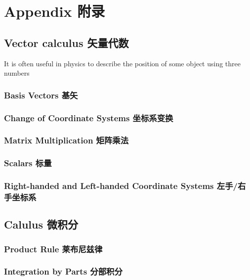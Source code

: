 
\appendix
\part{Appendix 附录}
\chapter[矢量代数]{Vector calculus 矢量代数}

It is often useful in physics to describe the position of some object
using three numbers

\section[基矢]{Basis Vectors 基矢}

\section[坐标系变换]{Change of Coordinate Systems 坐标系变换}

\section[矩阵乘法]{Matrix Multiplication 矩阵乘法}

\section[标量]{Scalars 标量}

\section[左手/右手坐标系]{Right-handed and Left-handed Coordinate Systems 左手/右手坐标系}

\chapter[微积分]{Calulus 微积分}

\section[Product Rule]{Product Rule 莱布尼兹律}

\section[分部积分]{Integration by Parts 分部积分}

